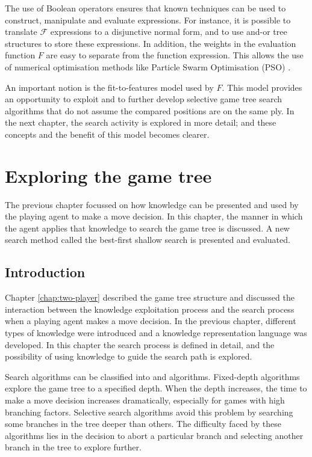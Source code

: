 The use of Boolean operators ensures that known techniques can be used to construct, manipulate and evaluate expressions.  For instance, it is possible to translate $\mathcal{F}$ expressions to a disjunctive normal form, and to use and-or tree structures to store these expressions.  In addition, the weights in the evaluation function $F$ are easy to separate from the function expression.  This allows the use of numerical optimisation methods like Particle Swarm Optimisation (PSO) \cite{kennedy:swarm}. 

An important notion is the fit-to-features model used by $F$. This model provides an opportunity to exploit and to further develop selective game tree search algorithms that do not assume the compared positions are on the same ply.  In the next chapter, the search activity is explored in more detail; and these concepts and the benefit of this model becomes clearer.

\chapter{Exploring the game tree}
\label{chap:tree}
{ \chapterintro
The previous chapter focussed on how knowledge can be presented and  used by the playing agent to make a move decision.  In this chapter, the manner in which the agent applies that knowledge to search the game tree is discussed.  A new search method called the best-first shallow search is presented and evaluated.
}

\section{Introduction}
\label{sec:tree-info}
Chapter \ref{chap:two-player} described the game tree structure and discussed the interaction between the knowledge exploitation process and the search process when a playing agent makes a move decision.  In the previous chapter, different types of knowledge were introduced and a knowledge representation language was developed.  In this chapter the search process is defined in detail, and the possibility of using  knowledge to guide the search path is explored.  

Search algorithms can be classified into  and  algorithms. Fixed-depth algorithms explore the game tree to a specified depth. When the depth increases, the time to make a move decision increases dramatically, especially for games with high branching factors.  Selective search algorithms avoid this problem by searching some branches in the tree deeper than others.  The difficulty faced by these algorithms lies in the decision to abort a particular branch and selecting another branch in the tree to explore further.  

